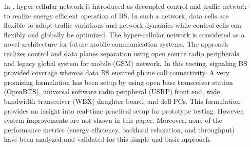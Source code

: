 \documentclass[article,10pt,twocolumn]{IEEEtran}
\begin{document}
In \citep{zhao2013software}, hyper-cellular network is introduced as decoupled control and traffic network to realize energy efficient operation of BS. In such a network, data cells are flexible to adapt traffic variations and network dynamics while control cells can flexibly and globally be optimized. The hyper-cellular network is considered as a novel architecture for future mobile communication systems. The approach realizes control and data planes separation using open source radio peripherals and legacy global system for mobile (GSM) network. In this testing, signaling BS provided coverage whereas data BS ensured phone call connectivity. A very promising formulation has been setup by using open base transceiver station (OpenBTS), universal software radio peripheral (USRP) front end, wide bandwidth transceiver (WBX) daughter board, and dell PCs. This formulation provides an insight into real-time practical setup for prototype testing. However, system improvements are not shown in this paper. Moreover, none of the performance metrics (energy efficiency, backhaul relaxation, and throughput) have been analyzed and validated for this simple and basic approach.
\end{document}
